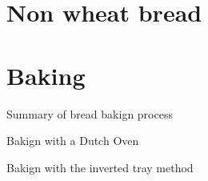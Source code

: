 \documentclass[draft, landscape, paper=a4, twoside=false,
                fontsize=12pt]{scrbook}
\begin{document}
\section*{Non wheat bread}
\begin{flowchart}[!htb]

\end{flowchart}
\clearpage{}
\section*{Baking}
\begin{flowchart}[!htb]

\caption*{Summary of bread bakign process}
\end{flowchart}

\begin{flowchart*}[!htb]

\caption*{Bakign with a Dutch Oven}
\end{flowchart*}

\begin{flowchart}[!htb]

\caption*{Bakign with the inverted tray method}
\end{flowchart}
\end{document}
